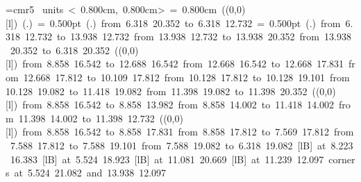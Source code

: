 \font\thinlinefont=cmr5
\mbox{\beginpicture
\setcoordinatesystem units < 0.800cm, 0.800cm>
\unitlength= 0.800cm
\linethickness=1pt
\setplotsymbol ({\makebox(0,0)[l]{\tencirc{}}})
\setshadesymbol ({\thinlinefont .})
\setlinear
%
%
\linethickness= 0.500pt
\setplotsymbol ({\thinlinefont .})
\putrule from  6.318 20.352 to  6.318 12.732
%
%
\linethickness= 0.500pt
\setplotsymbol ({\thinlinefont .})
\putrule from  6.318 12.732 to 13.938 12.732
\putrule from 13.938 12.732 to 13.938 20.352
\putrule from 13.938 20.352 to  6.318 20.352
%
%
\linethickness=1pt
\setplotsymbol ({\makebox(0,0)[l]{\tencirc{}}})
\putrule from  8.858 16.542 to 12.688 16.542
\putrule from 12.668 16.542 to 12.668 17.831
\putrule from 12.668 17.812 to 10.109 17.812
\putrule from 10.128 17.812 to 10.128 19.101
\putrule from 10.128 19.082 to 11.418 19.082
\putrule from 11.398 19.082 to 11.398 20.352
%
%
\linethickness=1pt
\setplotsymbol ({\makebox(0,0)[l]{\tencirc{}}})
\putrule from  8.858 16.542 to  8.858 13.982
\putrule from  8.858 14.002 to 11.418 14.002
\putrule from 11.398 14.002 to 11.398 12.732
%
%
\linethickness=1pt
\setplotsymbol ({\makebox(0,0)[l]{\tencirc{}}})
\putrule from  8.858 16.542 to  8.858 17.831
\putrule from  8.858 17.812 to  7.569 17.812
\putrule from  7.588 17.812 to  7.588 19.101
\putrule from  7.588 19.082 to  6.318 19.082
%
%
 [lB] at  8.223 16.383
%
%
 [lB] at  5.524 18.923
%
%
 [lB] at 11.081 20.669
%
%
 [lB] at 11.239 12.097
\linethickness=0pt
\putrectangle corners at  5.524 21.082 and 13.938 12.097
\endpicture}
